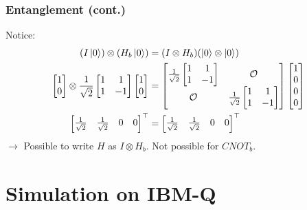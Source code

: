 \documentclass{beamer}
\theoremstyle{definition}
\begin{document}
\begin{frame}
\frametitle{Entanglement (cont.)}
Notice:
\begin{align*}
(I\left\vert{0}\right\rangle) \otimes (H_b\left\vert{0}\right\rangle) &= (I \otimes H_b)(\left\vert{0}\right\rangle \otimes \left\vert{0}\right\rangle) \\
\begin{bmatrix}
1\\0
\end{bmatrix}
\otimes
\frac{1}{\sqrt{2}}
\begin{bmatrix}
1&1\\1&-1
\end{bmatrix}
\begin{bmatrix}
1\\0
\end{bmatrix}
&=
\begin{bmatrix}
\frac{1}{\sqrt{2}}\begin{bmatrix}
1&1\\
1&-1
\end{bmatrix}& \mathcal{O}\\
\mathcal{O} & \frac{1}{\sqrt{2}}\begin{bmatrix}
1&1\\1&-1
\end{bmatrix}
\end{bmatrix}\begin{bmatrix}
1\\0\\0\\0
\end{bmatrix}\\
\begin{bmatrix}
\frac{1}{\sqrt{2}} & \frac{1}{\sqrt{2}} & 0&0
\end{bmatrix}^\top &= \begin{bmatrix}\frac{1}{\sqrt{2}} & \frac{1}{\sqrt{2}} & 0&0
\end{bmatrix}^\top 
\end{align*}
$\rightarrow$ Possible to write $H$ as $I \otimes H_b$. Not possible for $CNOT_b$.
\end{frame}







\section{Simulation on IBM-Q}
\end{document}
